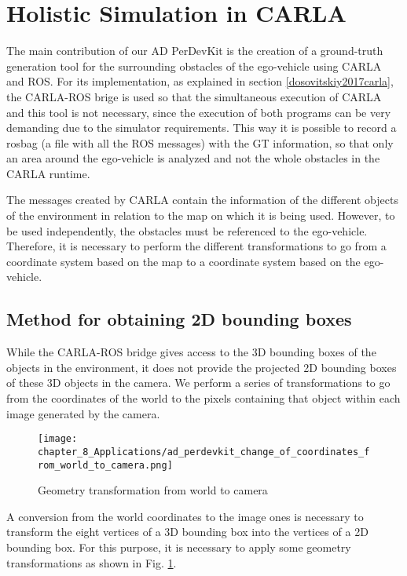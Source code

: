 \section{Holistic Simulation in CARLA}
\label{sec:8_holistic_simulation}

The main contribution of our AD PerDevKit is the creation of a ground-truth generation tool for the surrounding obstacles of the ego-vehicle using CARLA and ROS. For its implementation, as explained in section \ref{dosovitskiy2017carla}, the CARLA-ROS brige is used so that the simultaneous execution of CARLA and this tool is not necessary, since the execution of both programs can be very demanding due to the simulator requirements. This way it is possible to record a rosbag (a file with all the ROS messages) with the GT information, so that only an area around the ego-vehicle is analyzed and not the whole obstacles in the CARLA runtime.

The messages created by CARLA contain the information of the different objects of the environment in relation to the map on which it is being used. However, to be used independently, the obstacles must be referenced to the ego-vehicle. Therefore, it is necessary to perform the different transformations to go from a coordinate system based on the map to a coordinate system based on the ego-vehicle.

\subsection{Method for obtaining 2D bounding boxes}
While the CARLA-ROS bridge gives access to the 3D bounding boxes of the objects in the environment, it does not provide the projected 2D bounding boxes of these 3D objects in the camera. We perform a series of transformations to go from the coordinates of the world to the pixels containing that object within each image generated by the camera.

\begin{figure}[h]
	\centering
	\texttt{[image: chapter\_8\_Applications/ad\_perdevkit\_change\_of\_coordinates\_from\_world\_to\_camera.png]}
	\caption{Geometry transformation from world to camera}
	\label{fig:chapter_8_Applications/ad_perdevkit_change_of_coordinates_from_world_to_camera}
\end{figure}

A conversion from the world coordinates to the image ones is necessary to transform the eight vertices of a 3D bounding box into the vertices of a 2D bounding box. For this purpose, it is necessary to apply some geometry transformations as shown in Fig. \ref{fig:chapter_8_Applications/ad_perdevkit_change_of_coordinates_from_world_to_camera}.

